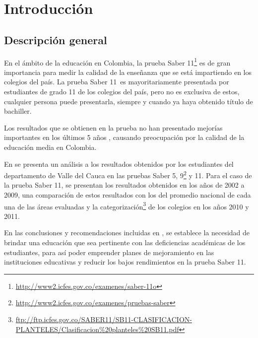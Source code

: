 \setcounter{page}{14}
\chapter{Introducción}
\section{Descripción general}
En el ámbito de la educación en Colombia, la prueba Saber 11\degree\footnote{\url{http://www2.icfes.gov.co/examenes/saber-11o}} es de gran importancia para medir la calidad de la enseñanza que se está impartiendo en los colegios del país. La prueba Saber 11\degree \ es mayoritariamente presentada por estudiantes de grado 11 de los colegios del país, pero no es exclusiva de estos, cualquier persona puede presentarla, siempre y cuando ya haya obtenido título de bachiller.

Los resultados que se obtienen en la prueba no han presentado mejorías importantes en los últimos 5 años \cite{key-1, key-2, key-3, key-4}, causando preocupación por la calidad de la educación media en Colombia.

En \cite{key-4} se presenta un análisis a los resultados obtenidos por los estudiantes del departamento de Valle del Cauca en las pruebas Saber 5\degree, 9\degree\footnote{\url{http://www2.icfes.gov.co/examenes/pruebas-saber}} y 11\degree. Para el caso de la prueba Saber 11\degree, se presentan los resultados obtenidos en los años de 2002 a 2009, una comparación de estos resultados con los del promedio nacional de cada una de las áreas evaluadas y la categorización\footnote{\url{ftp://ftp.icfes.gov.co/SABER11/SB11-CLASIFICACION-PLANTELES/Clasificacion\%20planteles\%20SB11.pdf}} de los colegios en los años 2010 y 2011.

En las conclusiones y recomendaciones incluidas en \cite{key-4}, se establece la necesidad de brindar una educación que sea pertinente con las deficiencias académicas de los estudiantes, para así poder emprender planes de mejoramiento en las instituciones educativas y reducir los bajos rendimientos en la prueba Saber 11\degree.

